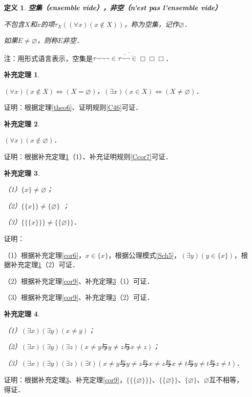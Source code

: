 \documentclass[12pt, a4paper, oneside]{book}
\newtheorem{cor}{补充定理}
\newtheorem{de}{定义}
\begin{document}
			\begin{de}
				\textbf{空集（ensemble vide），非空（n'est pas l'ensemble vide）}
				\par
				不包含$X$和$x$的项$\tau_X((\forall x)(x\notin X))$，称为空集，记作$\varnothing$．
				\par
				如果$E\neq \varnothing$，则称$E$非空．
			\end{de}
			注：用形式语言表示，空集是$\overline{\overline{\tau\neg\neg\neg\in\overline{\tau\neg\neg\in\Box}\Box}\Box}$．

			\begin{cor}\label{cor14}
				\hfill\par
				$(\forall x)(x\notin X)\Leftrightarrow (X=\varnothing)$，$(\exists x)(x\in X)\Leftrightarrow (X\neq \varnothing)$．
			\end{cor}
			证明：根据定理\ref{theo6}、证明规则\ref{C46}可证．

			\begin{cor}\label{cor15}
				\hfill\par
				$(\forall x)(x\notin \varnothing)$．
			\end{cor}
			证明：根据补充定理\ref{cor14}（1）、补充证明规则\ref{Ccor7}可证．

			\begin{cor}\label{cor16}
				\hfill\par
				（1）$\{x\}\neq \varnothing$；
				\par
				（2）$\{\{x\}\}\neq \{\varnothing\}$ ；
				\par
				（3）$\{\{\{x\}\}\}\neq \{\{\varnothing\}\}$．
			\end{cor}
			证明：
			\par
			（1）根据补充定理\ref{cor6}，$x\in \{x\}$，根据公理模式\ref{Sch5}，$(\exists y)(y\in \{x\})$，根据补充定理\ref{cor14}（2）可证．
			\par
			（2）根据补充定理\ref{cor9}、补充定理\ref{cor16}（1）可证．
			\par
			（3）根据补充定理\ref{cor9}、补充定理\ref{cor16}（2）可证．

			\begin{cor}\label{cor17}
				\hfill\par
				（1）$(\exists x)(\exists y)(x\neq y)$；
				\par
				（2）$(\exists x)(\exists y)(\exists z)(x\neq y\text{与}y\neq z\text{与}x\neq z)$；
				\par
				（3）$(\exists x)(\exists y)(\exists z)(\exists t)(x\neq y\text{与}y\neq z\text{与}x\neq z\text{与}x\neq t\text{与}y\neq t\text{与}z\neq t)$．
			\end{cor}
			证明：根据补充定理\ref{cor16}、补充定理\ref{cor9}，$\{\{\{\varnothing\}\}\}$、$\{\{\varnothing\}\}$、$\{\varnothing\}$、$\varnothing$互不相等，得证．
\end{document}
